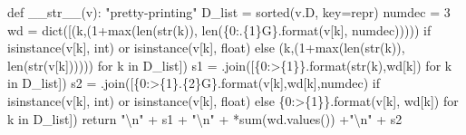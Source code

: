 \documentclass[
  letterpaper,
  DIV=11,
  numbers=noendperiod]{scrartcl}
\newenvironment{Shaded}{\begin{snugshade}}{\end{snugshade}}
\newcommand{\BuiltInTok}[1]{\textcolor[rgb]{0.00,0.23,0.31}{#1}}
\newcommand{\CharTok}[1]{\textcolor[rgb]{0.13,0.47,0.30}{#1}}
\newcommand{\CommentTok}[1]{\textcolor[rgb]{0.37,0.37,0.37}{#1}}
\newcommand{\ControlFlowTok}[1]{\textcolor[rgb]{0.00,0.23,0.31}{#1}}
\newcommand{\DecValTok}[1]{\textcolor[rgb]{0.68,0.00,0.00}{#1}}
\newcommand{\FunctionTok}[1]{\textcolor[rgb]{0.28,0.35,0.67}{#1}}
\newcommand{\KeywordTok}[1]{\textcolor[rgb]{0.00,0.23,0.31}{#1}}
\newcommand{\NormalTok}[1]{\textcolor[rgb]{0.00,0.23,0.31}{#1}}
\newcommand{\OperatorTok}[1]{\textcolor[rgb]{0.37,0.37,0.37}{#1}}
\newcommand{\SpecialCharTok}[1]{\textcolor[rgb]{0.37,0.37,0.37}{#1}}
\newcommand{\StringTok}[1]{\textcolor[rgb]{0.13,0.47,0.30}{#1}}
\begin{document}
\begin{Shaded}
\begin{Highlighting}[numbers=left,,]
    \KeywordTok{def} \FunctionTok{\_\_str\_\_}\NormalTok{(v):}
        \CommentTok{"pretty{-}printing"}
\NormalTok{        D\_list }\OperatorTok{=} \BuiltInTok{sorted}\NormalTok{(v.D, key}\OperatorTok{=}\BuiltInTok{repr}\NormalTok{)}
\NormalTok{        numdec }\OperatorTok{=} \DecValTok{3}
\NormalTok{        wd }\OperatorTok{=} \BuiltInTok{dict}\NormalTok{([(k,(}\DecValTok{1}\OperatorTok{+}\BuiltInTok{max}\NormalTok{(}\BuiltInTok{len}\NormalTok{(}\BuiltInTok{str}\NormalTok{(k)), }\BuiltInTok{len}\NormalTok{(}\StringTok{\textquotesingle{}\{0:.}\SpecialCharTok{\{1\}}\StringTok{G\}\textquotesingle{}}\NormalTok{.}\BuiltInTok{format}\NormalTok{(v[k], numdec))))) }\ControlFlowTok{if} \BuiltInTok{isinstance}\NormalTok{(v[k], }\BuiltInTok{int}\NormalTok{) }\KeywordTok{or} \BuiltInTok{isinstance}\NormalTok{(v[k], }\BuiltInTok{float}\NormalTok{) }\ControlFlowTok{else}\NormalTok{ (k,(}\DecValTok{1}\OperatorTok{+}\BuiltInTok{max}\NormalTok{(}\BuiltInTok{len}\NormalTok{(}\BuiltInTok{str}\NormalTok{(k)), }\BuiltInTok{len}\NormalTok{(}\BuiltInTok{str}\NormalTok{(v[k]))))) }\ControlFlowTok{for}\NormalTok{ k }\KeywordTok{in}\NormalTok{ D\_list])}
\NormalTok{        s1 }\OperatorTok{=} \StringTok{\textquotesingle{}\textquotesingle{}}\NormalTok{.join([}\StringTok{\textquotesingle{}\{0:\textgreater{}}\SpecialCharTok{\{1\}}\StringTok{\}\textquotesingle{}}\NormalTok{.}\BuiltInTok{format}\NormalTok{(}\BuiltInTok{str}\NormalTok{(k),wd[k]) }\ControlFlowTok{for}\NormalTok{ k }\KeywordTok{in}\NormalTok{ D\_list])}
\NormalTok{        s2 }\OperatorTok{=} \StringTok{\textquotesingle{}\textquotesingle{}}\NormalTok{.join([}\StringTok{\textquotesingle{}\{0:\textgreater{}}\SpecialCharTok{\{1\}}\StringTok{.}\SpecialCharTok{\{2\}}\StringTok{G\}\textquotesingle{}}\NormalTok{.}\BuiltInTok{format}\NormalTok{(v[k],wd[k],numdec) }\ControlFlowTok{if} \BuiltInTok{isinstance}\NormalTok{(v[k], }\BuiltInTok{int}\NormalTok{) }\KeywordTok{or} \BuiltInTok{isinstance}\NormalTok{(v[k], }\BuiltInTok{float}\NormalTok{) }\ControlFlowTok{else} \StringTok{\textquotesingle{}\{0:\textgreater{}}\SpecialCharTok{\{1\}}\StringTok{\}\textquotesingle{}}\NormalTok{.}\BuiltInTok{format}\NormalTok{(v[k], wd[k]) }\ControlFlowTok{for}\NormalTok{ k }\KeywordTok{in}\NormalTok{ D\_list])}
        \ControlFlowTok{return} \StringTok{"}\CharTok{\textbackslash{}n}\StringTok{"} \OperatorTok{+}\NormalTok{ s1 }\OperatorTok{+} \StringTok{"}\CharTok{\textbackslash{}n}\StringTok{"} \OperatorTok{+} \StringTok{\textquotesingle{}{-}\textquotesingle{}}\OperatorTok{*}\BuiltInTok{sum}\NormalTok{(wd.values()) }\OperatorTok{+}\StringTok{"}\CharTok{\textbackslash{}n}\StringTok{"} \OperatorTok{+}\NormalTok{ s2}


\end{Highlighting}
\end{Shaded}
\end{document}

